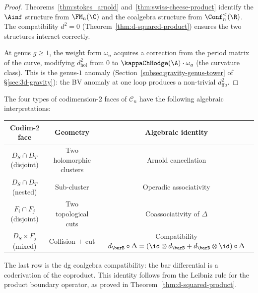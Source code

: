 \begin{proof}
Theorems~\ref{thm:stokes_arnold}
and~\ref{thm:swiss-cheese-product} identify the
$\Ainf$ structure from $\FM_n(\C)$ and the coalgebra
structure from $\Conf_n^<(\R)$. The compatibility
$d^2 = 0$ (Theorem~\ref{thm:d-squared-product})
ensures the two structures interact correctly.

At genus $g \ge 1$, the weight form $\omega_n$ acquires
a correction from the period matrix of the curve,
modifying $d_{\mathrm{hol}}^2$ from $0$ to
$\kappaChHodge(\A) \cdot \omega_g$ (the curvature class).
This is the genus-$1$ anomaly
(Section~\ref{subsec:gravity-genus-tower} of
\S\ref{sec:3d-gravity}): the BV anomaly at one loop
produces a non-trivial $d_{\mathrm{fib}}^2$.
\end{proof}

\begin{remark}
The four types of codimension-$2$ faces of
$\mathcal{C}_n$ have the following algebraic
interpretations:
\begin{center}
\renewcommand{\arraystretch}{1.2}
\begin{tabular}{c|c|c}
\textbf{Codim-$2$ face} & \textbf{Geometry}
 & \textbf{Algebraic identity} \\
\hline
$D_S \cap D_T$ (disjoint)
 & Two holomorphic clusters
 & Arnold cancellation \\
$D_S \cap D_T$ (nested)
 & Sub-cluster
 & Operadic associativity \\
$F_i \cap F_j$ (disjoint)
 & Two topological cuts
 & Coassociativity of $\Delta$ \\
$D_S \times F_j$ (mixed)
 & Collision $+$ cut
 & Compatibility $d_{\barB} \circ \Delta
 = (\id \otimes d_{\barB}
 + d_{\barB} \otimes \id) \circ \Delta$
\end{tabular}
\end{center}
The last row is the dg coalgebra compatibility:
the bar differential is a coderivation of the
coproduct. This identity follows from the Leibniz
rule for the product boundary operator, as proved in
Theorem~\ref{thm:d-squared-product}.
\end{remark}


